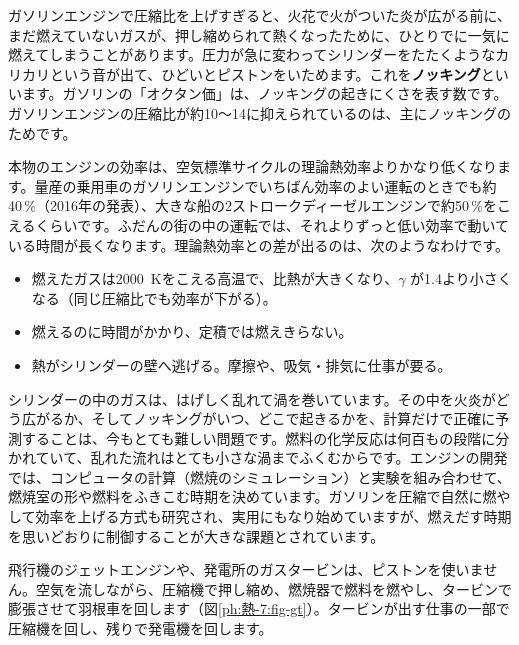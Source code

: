 \label{ph:熱-7:sec5}
ガソリンエンジンで圧縮比を上げすぎると、火花で火がついた炎が広がる前に、まだ燃えていないガスが、押し縮められて熱くなったために、ひとりでに一気に燃えてしまうことがあります。圧力が急に変わってシリンダーをたたくようなカリカリという音が出て、ひどいとピストンをいためます。これを\textbf{ノッキング}といいます。ガソリンの「オクタン価」は、ノッキングの起きにくさを表す数です。ガソリンエンジンの圧縮比が約10〜14に抑えられているのは、主にノッキングのためです。

本物のエンジンの効率は、空気標準サイクルの理論熱効率よりかなり低くなります。量産の乗用車のガソリンエンジンでいちばん効率のよい運転のときでも約40\,\%（2016年の発表）、大きな船の2ストロークディーゼルエンジンで約50\,\%をこえるくらいです。ふだんの街の中の運転では、それよりずっと低い効率で動いている時間が長くなります。理論熱効率との差が出るのは、次のようなわけです。
\begin{itemize}[leftmargin=2\zw, itemsep=1pt, topsep=2pt]
\item 燃えたガスは\qty{2000}{K}をこえる高温で、比熱が大きくなり、$\gamma$ が1.4より小さくなる（同じ圧縮比でも効率が下がる）。
\item 燃えるのに時間がかかり、定積では燃えきらない。
\item 熱がシリンダーの壁へ逃げる。摩擦や、吸気・排気に仕事が要る。
\end{itemize}

\begin{phmada}[炎は、エンジンの中でどう広がる？]
シリンダーの中のガスは、はげしく乱れて渦を巻いています。その中を火炎がどう広がるか、そしてノッキングがいつ、どこで起きるかを、計算だけで正確に予測することは、今もとても難しい問題です。燃料の化学反応は何百もの段階に分かれていて、乱れた流れはとても小さな渦までふくむからです。エンジンの開発では、コンピュータの計算（燃焼のシミュレーション）と実験を組み合わせて、燃焼室の形や燃料をふきこむ時期を決めています。ガソリンを圧縮で自然に燃やして効率を上げる方式も研究され、実用にもなり始めていますが、燃えだす時期を思いどおりに制御することが大きな課題とされています。
\end{phmada}

\label{ph:熱-7:sec6}
飛行機のジェットエンジンや、発電所のガスタービンは、ピストンを使いません。空気を流しながら、圧縮機で押し縮め、燃焼器で燃料を燃やし、タービンで膨張させて羽根車を回します（図\ref{ph:熱-7:fig-gt}）。タービンが出す仕事の一部で圧縮機を回し、残りで発電機を回します。

